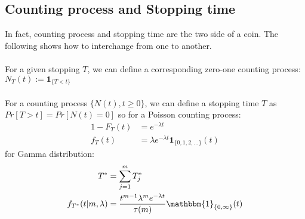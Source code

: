 \documentclass[11pt]{article}
\begin{document}
\subsection{Counting process and Stopping time}
In fact, counting process and stopping time are the two side of a coin. The following shows how to interchange from one to another.\\

\\
For a given stopping $T$, we can define a corresponding zero-one counting process: $N_T(t) := \mathbf{1}_{\{T<t \}}$\\

\\
For a counting process $\{N(t),t\geq0\}$, we can define a stopping time $T$ as $Pr[T>t] = Pr[N(t)=0]$ so for a Poisson counting process:
\begin{align*}
1-F_{T}(t) &= e^{-\lambda t}\\
f_T(t)&=\lambda e^{-\lambda t}\mathbf{1}_{\{0,1,2,...\}}(t)
\end{align*}
for Gamma distribution:
\begin{align*}
T^*&=\sum_{j=1}^mT_j^*\\
f_{T^*}(t|m,\lambda)&=\frac{t^{m-1}\lambda^m e^{-\lambda t}}{\tau(m)}\mathbbm{1}_{\{0,\infty\}}(t)
\end{align*}
\end{document}
